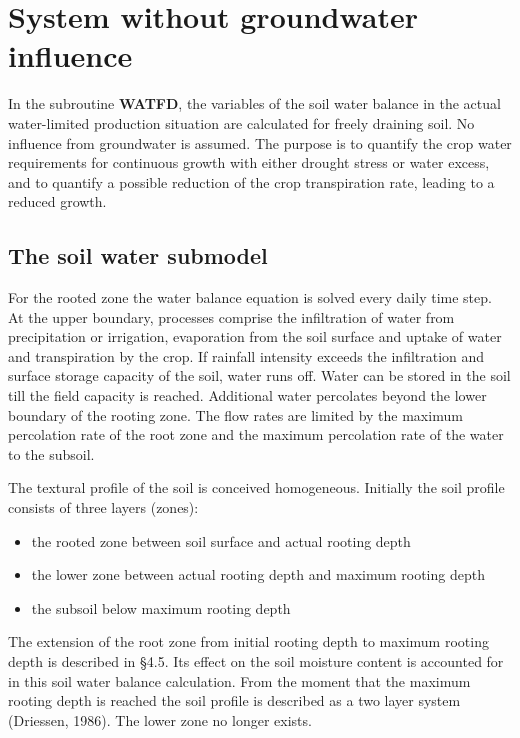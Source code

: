 \section{System without groundwater influence}

In the subroutine {\bf WATFD}, the variables of the soil water balance in the actual 
water-limited produc\-tion situation are calculated for freely draining soil. No influence from
groundwater is assumed. The purpose is to quantify the crop water requirements for
continuous growth with either drought stress or water excess, and to quantify a possible
reduction of the crop transpiration rate, leading to a reduced growth.

\subsection{The soil water submodel}

For the rooted zone the water balance equation is solved every daily time step. At the
upper boundary, processes comprise the infiltration of water from precipitation or
irrigation, evaporation from the soil surface and uptake of water and transpiration by the
crop. If rainfall intensity exceeds the infiltration and surface storage capacity of the soil,
water runs off. Water can be stored in the soil till the field capacity is reached. Additional
water percolates beyond the lower boundary of the rooting zone.
The flow rates are limited by the maximum percolation rate of the root zone and the
maximum percolation rate of the water to the subsoil.

The textural profile of the soil is conceived homogeneous. Initially the soil profile
consists of three layers (zones):
\begin{itemize}
\item the rooted zone between soil surface and actual rooting depth\\
\item the lower zone between actual rooting depth and maximum rooting depth\\
\item the subsoil below maximum rooting depth
\end{itemize}

The extension of the root zone from initial rooting depth to maximum rooting depth is
described in \S 4.5. Its effect on the soil moisture content is accounted for in this soil water
balance calculation. From the moment that the maximum rooting depth is reached the soil
profile is described as a two layer system (Driessen, 1986). The lower zone no longer
exists.

